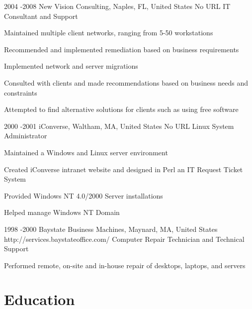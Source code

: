 \documentclass[10pt]{article} %
\begin{document}
\job
{2004 -}{2008}
{New Vision Consulting, Naples, FL, United States}
{No URL}
{IT Consultant and Support}
{\begin{itemize-noindent}
\item{Maintained multiple client networks, ranging from 5-50 workstations}
\item{Recommended and implemented remediation based on business requirements}
\item{Implemented network and server migrations}
\item{Consulted with clients and made recommendations based on business needs and constraints}
\item{Attempted to find alternative solutions for clients such as using free software}
\end{itemize-noindent}}
\job
{2000 -}{2001}
{iConverse, Waltham, MA, United States}
{No URL}
{Linux System Administrator}
{\begin{itemize-noindent}
\item{Maintained a Windows and Linux server environment}
\item{Created iConverse intranet website and designed in Perl an IT Request Ticket System}
\item{Provided Windows NT 4.0/2000 Server installations}
\item{Helped manage Windows NT Domain}
\end{itemize-noindent}}

\job
{1998 -}{2000}
{Baystate Business Machines, Maynard, MA, United States}
{http://services.baystateoffice.com/}
{Computer Repair Technician and Technical Support}
{\begin{itemize-noindent}
\item{Performed remote, on-site and in-house repair of desktops, laptops, and servers}
\end{itemize-noindent}}
\section{Education}
\end{document}
